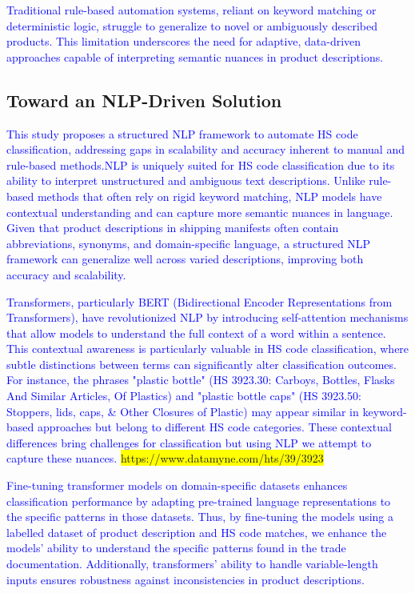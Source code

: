 \documentclass[mnsc,nonblindrev]{informs3} %
\begin{document}
\textcolor{blue}{Traditional rule-based automation systems, reliant on keyword matching or deterministic logic, struggle to generalize to novel or ambiguously described products. This limitation underscores the need for adaptive, data-driven approaches capable of interpreting semantic nuances in product descriptions.}

\subsection{Toward an NLP-Driven Solution}

\textcolor{blue}{This study proposes a structured NLP framework to automate HS code classification, addressing gaps in scalability and accuracy inherent to manual and rule-based methods.NLP is uniquely suited for HS code classification due to its ability to interpret unstructured and ambiguous text descriptions. Unlike rule-based methods that often rely on rigid keyword matching, NLP models have contextual understanding and can capture more semantic nuances in language. Given that product descriptions in shipping manifests often contain abbreviations, synonyms, and domain-specific language, a structured NLP framework can generalize well across varied descriptions, improving both accuracy and scalability.}

\textcolor{blue}{Transformers, particularly BERT (Bidirectional Encoder Representations from Transformers), have revolutionized NLP by introducing self-attention mechanisms that allow models to understand the full context of a word within a sentence. This contextual awareness is particularly valuable in HS code classification, where subtle distinctions between terms can significantly alter classification outcomes. For instance, the phrases "plastic bottle" (HS 3923.30: Carboys, Bottles, Flasks And Similar Articles, Of Plastics) and "plastic bottle caps" (HS 3923.50: Stoppers, lids, caps, \& Other Closures of Plastic) may appear similar in keyword-based approaches but belong to different HS code categories. These contextual differences bring challenges for classification but using NLP we attempt to capture these nuances.}  \colorbox{yellow}{https://www.datamyne.com/hts/39/3923}

\textcolor{blue}{Fine-tuning transformer models on domain-specific datasets enhances classification performance by adapting pre-trained language representations to the specific patterns in those datasets. Thus, by fine-tuning the models using a labelled dataset of product description and HS code matches, we enhance the models’ ability to understand the specific patterns found in the trade documentation. Additionally, transformers’ ability to handle variable-length inputs ensures robustness against inconsistencies in product descriptions.}
\end{document}
